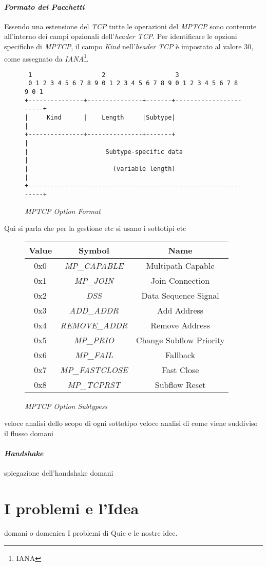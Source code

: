\paragraph{\textit{Formato dei Pacchetti}}
\noindent Essendo una estensione del \emph{TCP} tutte le operazioni del \emph{MPTCP} sono contenute all'interno dei campi opzionali dell'\emph{header TCP}. 
Per identificare le opzioni specifiche di \emph{MPTCP}, il campo \emph{Kind} nell'\emph{header} \emph{TCP} è impostato al valore 30, come assegnato da \emph{IANA}\footnote{\gls{IANA}}.
\begin{figure}[!h]
    \centering
          \begin{BVerbatim}
 1                   2                   3
 0 1 2 3 4 5 6 7 8 9 0 1 2 3 4 5 6 7 8 9 0 1 2 3 4 5 6 7 8 9 0 1
+---------------+---------------+-------+-----------------------+
|     Kind      |    Length     |Subtype|                       |
+---------------+---------------+-------+                       |
|                     Subtype-specific data                     |
|                       (variable length)                       |
+---------------------------------------------------------------+   
        \end{BVerbatim}
    \caption{\emph{MPTCP Option Format}}
    \label{mptcp-option-format}
\end{figure}

Qui si parla che per la gestione etc si usano i sottotipi etc 
\begin{figure}[!h]
    \centering
    \begin{tabular}{|c|c|c|}
        \hline
        \textbf{Value} & \textbf{Symbol} & \textbf{Name} \\
        \hline
        0x0 & \emph{MP\_CAPABLE} & Multipath Capable \\
        \hline
        0x1 & \emph{MP\_JOIN} & Join Connection \\
        \hline
        0x2 & \emph{DSS} & Data Sequence Signal \\
        \hline
        0x3 & \emph{ADD\_ADDR} & Add Address \\
        \hline
        0x4 & \emph{REMOVE\_ADDR} & Remove Address \\
        \hline
        0x5 & \emph{MP\_PRIO} & Change Subflow Priority \\
        \hline
        0x6 & \emph{MP\_FAIL} & Fallback \\
        \hline
        0x7 & \emph{MP\_FASTCLOSE} & Fast Close \\
        \hline
        0x8 & \emph{MP\_TCPRST} & Subflow Reset \\
        \hline
    \end{tabular}
    \caption{\emph{MPTCP Option Subtypess}}
    \label{options-subtypes}
\end{figure}
veloce analisi dello scopo di ogni sottotipo 
veloce analisi di come viene suddiviso il flusso 
domani

\paragraph{\textit{Handshake}}
spiegazione dell'handshake
domani

\section{I problemi e l'Idea}
domani o domenica
I problemi di Quic e le nostre idee.


